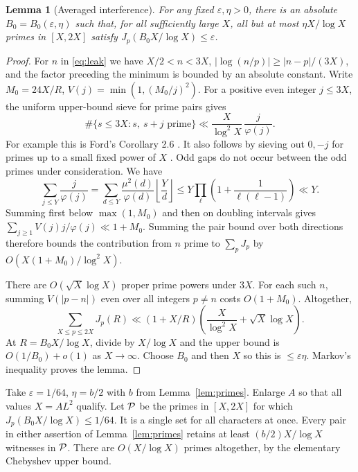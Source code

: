 \documentclass[11pt,letterpaper]{article}
\newtheorem{lemma}[theorem]{Lemma}
\begin{document}
\begin{lemma}[Averaged interference]\label{lem:sieve}
For any fixed $\varepsilon,\eta>0$, there is an absolute $B_0=B_0(\varepsilon,\eta)$ such that, for all sufficiently large $X$, all but at most $\eta X/\log X$ primes in $[X,2X]$ satisfy $J_p(B_0X/\log X)\le\varepsilon$.
\end{lemma}
\begin{proof}
For $n$ in \eqref{eq:leak} we have $X/2<n<3X$, $|\log(n/p)|\ge|n-p|/(3X)$, and the factor preceding the minimum is bounded by an absolute constant. Write $M_0=24X/R$, $V(j)=\min(1,(M_0/j)^2)$. For a positive even integer $j\le3X$, the uniform upper-bound sieve for prime pairs gives
\[
 \#\{s\le3X:s,\ s+j\text{ prime}\}\ll
 \frac{X}{\log^2 X}\,\frac j{\varphi(j)} .
\]
For example this is Ford's Corollary 2.6 \cite{ford}. It also follows by sieving out $0,-j$ for primes up to a small fixed power of $X$ \cite[Lemma 3.2]{tao}. Odd gaps do not occur between the odd primes under consideration. We have
\[
 \sum_{j\le Y}\frac j{\varphi(j)}
 =\sum_{d\le Y}\frac{\mu^2(d)}{\varphi(d)}
                 \left\lfloor\frac Yd\right\rfloor
 \le Y\prod_\ell\left(1+\frac1{\ell(\ell-1)}\right)\ll Y.
\]
Summing first below $\max(1,M_0)$ and then on doubling intervals gives
$\sum_{j\ge1} V(j)j/\varphi(j)\ll 1+M_0$. Summing the pair bound over both directions therefore bounds the contribution from $n$ prime to $\sum_pJ_p$ by $O(X(1+M_0)/\log^2 X)$.

There are $O(\sqrt X\log X)$ proper prime powers under $3X$. For each such $n$, summing $V(|p-n|)$ even over all integers $p\ne n$ costs $O(1+M_0)$. Altogether,
\begin{equation}\label{eq:sumJ}
 \sum_{X\le p\le 2X}J_p(R)
 \ll (1+X/R)\left(\frac X{\log^2 X}+\sqrt X\log X\right).
\end{equation}
At $R=B_0 X/\log X$, divide by $X/\log X$ and the upper bound is $O(1/B_0)+o(1)$ as $X\to\infty$. Choose $B_0$ and then $X$ so this is $\le\varepsilon\eta$. Markov's inequality proves the lemma.
\end{proof}

Take $\varepsilon=1/64$, $\eta=b/2$ with $b$ from Lemma~\ref{lem:primes}. Enlarge $A$ so that all values $X=A L^2$ qualify. Let $\mathcal P$ be the primes in $[X,2X]$ for which $J_p(B_0X/\log X)\le1/64$. It is a single set for all characters at once. Every pair in either assertion of Lemma~\ref{lem:primes} retains at least $(b/2)X/\log X$ witnesses in $\mathcal P$. There are $O(X/\log X)$ primes altogether, by the elementary Chebyshev upper bound.
\end{document}
